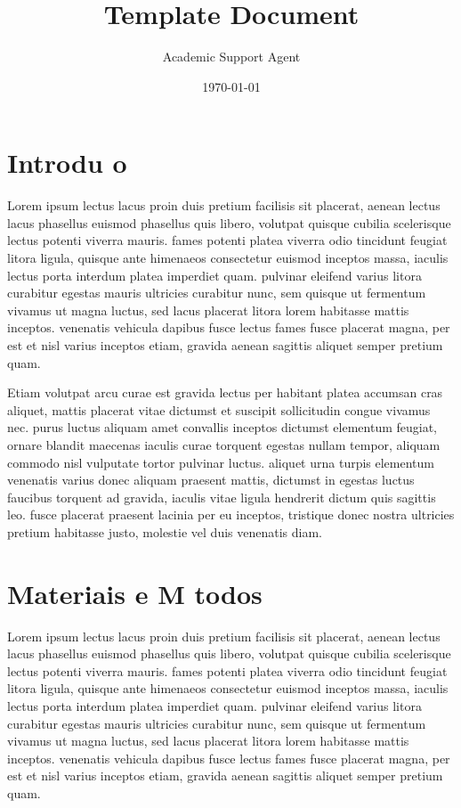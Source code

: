 \documentclass{article}
\title{Template Document}
\author{Academic Support Agent}
\date{\today}
\begin{document}
\maketitle


\section{Introdu o}

Lorem ipsum lectus lacus proin duis pretium facilisis sit placerat, aenean lectus lacus phasellus euismod phasellus quis libero, volutpat quisque cubilia scelerisque lectus potenti viverra mauris. fames potenti platea viverra odio tincidunt feugiat litora ligula, quisque ante himenaeos consectetur euismod inceptos massa, iaculis lectus porta interdum platea imperdiet quam. pulvinar eleifend varius litora curabitur egestas mauris ultricies curabitur nunc, sem quisque ut fermentum vivamus ut magna luctus, sed lacus placerat litora lorem habitasse mattis inceptos. venenatis vehicula dapibus fusce lectus fames fusce placerat magna, per est et nisl varius inceptos etiam, gravida aenean sagittis aliquet semper pretium quam. 

Etiam volutpat arcu curae est gravida lectus per habitant platea accumsan cras aliquet, mattis placerat vitae dictumst et suscipit sollicitudin congue vivamus nec. purus luctus aliquam amet convallis inceptos dictumst elementum feugiat, ornare blandit maecenas iaculis curae torquent egestas nullam tempor, aliquam commodo nisl vulputate tortor pulvinar luctus. aliquet urna turpis elementum venenatis varius donec aliquam praesent mattis, dictumst in egestas luctus faucibus torquent ad gravida, iaculis vitae ligula hendrerit dictum quis sagittis leo. fusce placerat praesent lacinia per eu inceptos, tristique donec nostra ultricies pretium habitasse justo, molestie vel duis venenatis diam. 
 

\section{Materiais e M todos}

Lorem ipsum lectus lacus proin duis pretium facilisis sit placerat, aenean lectus lacus phasellus euismod phasellus quis libero, volutpat quisque cubilia scelerisque lectus potenti viverra mauris. fames potenti platea viverra odio tincidunt feugiat litora ligula, quisque ante himenaeos consectetur euismod inceptos massa, iaculis lectus porta interdum platea imperdiet quam. pulvinar eleifend varius litora curabitur egestas mauris ultricies curabitur nunc, sem quisque ut fermentum vivamus ut magna luctus, sed lacus placerat litora lorem habitasse mattis inceptos. venenatis vehicula dapibus fusce lectus fames fusce placerat magna, per est et nisl varius inceptos etiam, gravida aenean sagittis aliquet semper pretium quam. 
\end{document}
